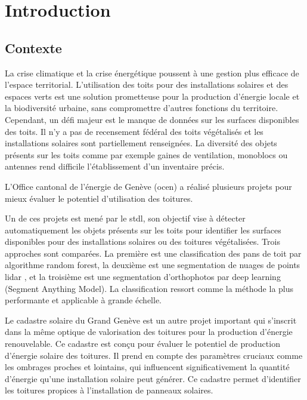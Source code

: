 
\chapter{Introduction}
\label{chap:introduction}

\section{Contexte}

\par{La crise climatique \cite{lee_ipcc_2023} et la crise énergétique poussent à une gestion plus efficace de l'espace territorial. L'utilisation des toits pour des installations solaires et des espaces verts est une solution prometteuse pour la production d'énergie locale et la biodiversité urbaine, sans compromettre d'autres fonctions du territoire. Cependant, un défi majeur est le manque de données sur les surfaces disponibles des toits. Il n'y a pas de recensement fédéral des toits végétalisés et les installations solaires sont partiellement renseignées. La diversité des objets présents sur les toits comme par exemple gaines de ventilation, monoblocs ou antennes rend difficile l'établissement d'un inventaire précis.}

\par{L'Office cantonal de l'énergie de Genève (\acrshort{ocen}) a réalisé plusieurs projets pour mieux évaluer le potentiel d’utilisation des toitures.}

\par{Un de ces projets \cite{herny_detection_2024} est mené par le \gls{stdl}, son objectif vise à détecter automatiquement les objets présents sur les toits pour identifier les surfaces disponibles pour des installations solaires ou des toitures végétalisées. Trois approches sont comparées. La première est une classification des pans de toit par algorithme random forest, la deuxième est une segmentation de nuages de points \gls{lidar} , et la troisième est une segmentation d'orthophotos par deep learning (Segment Anything Model). La classification ressort comme la méthode la plus performante et applicable à grande échelle.}

\par{Le cadastre solaire du Grand Genève \cite{desthieux_solar_2018} est un autre projet important qui s'inscrit dans la même optique de valorisation des toitures pour la production d'énergie renouvelable. Ce cadastre est conçu pour évaluer le potentiel de production d'énergie solaire des toitures. Il prend en compte des paramètres cruciaux comme les ombrages proches et lointains, qui influencent significativement la quantité d'énergie qu'une installation solaire peut générer. Ce cadastre permet d’identifier les toitures propices à l’installation de panneaux solaires.}

